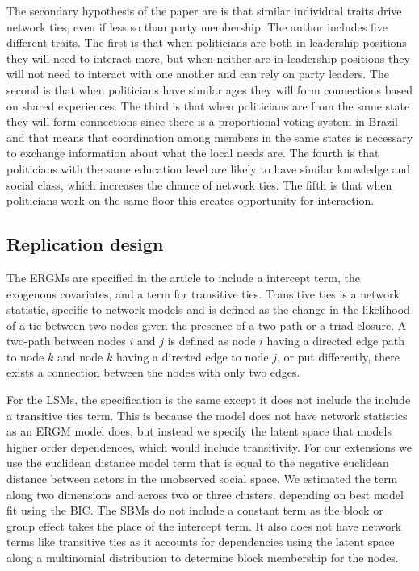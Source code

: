 \documentclass[fleqn,12pt]{wlscirep}
\begin{document}
The secondary hypothesis of the paper are is that similar individual traits drive network ties, even if less so than party membership. The author includes five different traits. The first is that when politicians are both in leadership positions they will need to interact more, but when neither are in leadership positions they will not need to interact with one another and can rely on party leaders. The second is that when politicians have similar ages they will form connections based on shared experiences.  The third is that when politicians are from the same state they will form connections since there is a proportional voting system in Brazil and that means that coordination among members in the same states is necessary to exchange information about what the local needs are. The fourth is that politicians with the same education level are likely to have similar knowledge and social class, which increases the chance of network ties. The fifth is that when politicians work on the same floor this creates opportunity for interaction.


\subsection{Replication design}

The ERGMs are specified in the article to include a intercept term, the exogenous covariates, and a term for transitive ties. Transitive ties is a network statistic, specific to network models and is defined as the change in the likelihood of a tie between two nodes given the presence of a two-path or a triad closure. A two-path between nodes $i$ and $j$ is defined as node $i$ having a directed edge path to node $k$ and node $k$ having a directed edge to node $j$, or put differently, there exists a connection between the nodes with only two edges.
 

For the LSMs, the specification is the same except it does not include the include a transitive ties term. This is because the model does not have network statistics as an ERGM model does, but instead we specify the latent space that models higher order dependences, which would include transitivity. For our extensions we use the euclidean distance model term that is equal to the negative euclidean distance between actors in the unobserved social space. We estimated the term along two dimensions and across two or three clusters, depending on best model fit using the BIC. The SBMs do not include a constant term as the block or group effect takes the place of the intercept term. It also does not have network terms like transitive ties as it accounts for dependencies using the latent space along a multinomial distribution to determine block membership for the nodes. 
\end{document}

